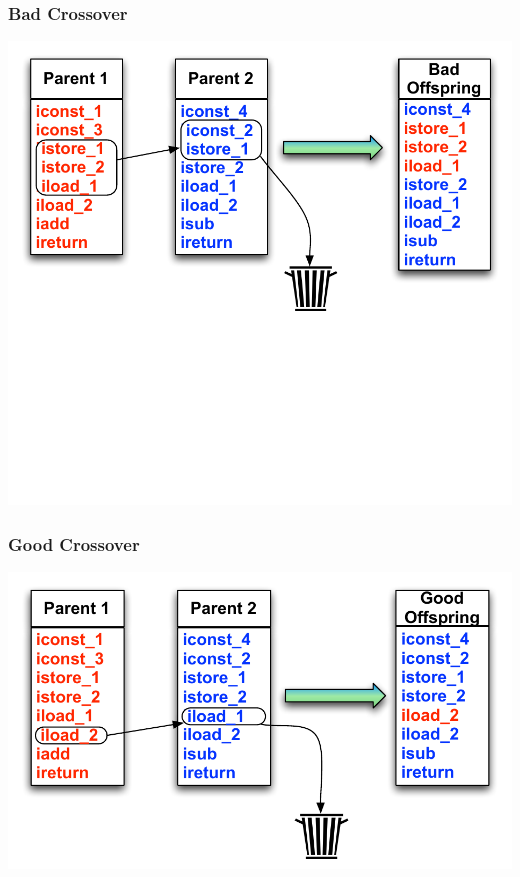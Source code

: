 \documentclass{beamer}
\newcommand{\linespace}{\vskip 0.25cm}
\begin{document}
\begin{frame}
  \frametitle{Bad Crossover}
  \begin{center}
  \linespace
  \linespace
  \linespace
  \linespace
  \includegraphics[height=.8\textheight]{Illustrations/badCrossover.pdf}
  \end{center}
  
\end{frame}


\begin{frame}

  \frametitle{Good Crossover}
  \begin{center}
  \includegraphics[height=.5\textheight]{Illustrations/goodCrossover.pdf}
  \end{center}
  
\end{frame}
\end{document}
